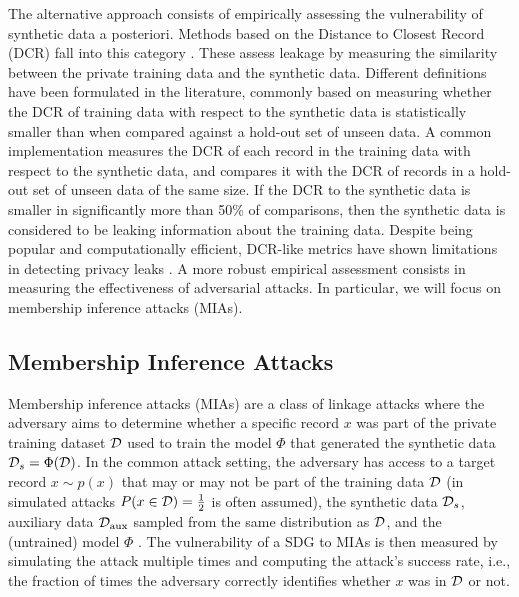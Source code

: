 The alternative approach consists of empirically assessing the vulnerability of synthetic data a posteriori.
Methods based on the Distance to Closest Record (DCR) fall into this category \citep{park2018data, kotelnikov2023tabddpm, platzer2021holdout}. These assess leakage by measuring the similarity between the private training data and the synthetic data. Different definitions have been formulated in the literature, commonly based on measuring whether the DCR of training data with respect to the synthetic data is statistically smaller than when compared against a hold-out set of unseen data.
A common implementation measures the DCR of each record in the training data with respect to the synthetic data, and compares it with the DCR of records in a hold-out set of unseen data of the same size.
If the DCR to the synthetic data is smaller in significantly more than 50\% of comparisons, then the synthetic data is considered to be leaking information about the training data.
Despite being popular and computationally efficient, DCR-like metrics have shown limitations in detecting privacy leaks \citep{yao2025dcr}.
A more robust empirical assessment consists in measuring the effectiveness of adversarial attacks. In particular, we will focus on membership inference attacks (MIAs).

\subsection{Membership Inference Attacks}
Membership inference attacks (MIAs) \citep{homer2008resolving, shokri2017membership, salem2018ml, stadler2022synthetic, hu2022membership} are a class of linkage attacks where the adversary aims to determine whether a specific record $x$ was part of the private training dataset $\mathcal{D}$ used to train the model $\Phi$ that generated the synthetic data $\mathcal{D}_s = \Phi(\mathcal{D})$.
In the common attack setting, the adversary has access to a target record $x \sim p(x)$ that may or may not be part of the training data $\mathcal{D}$ (in simulated attacks $P(x \in \mathcal{D}) = \frac{1}{2}$ is often assumed), the synthetic data $\mathcal{D}_s$, auxiliary data $\mathcal{D}_{\text{aux}}$ sampled from the same distribution as $\mathcal{D}$, and the (untrained) model $\Phi$ \citep{stadler2022synthetic}.
The vulnerability of a SDG to MIAs is then measured by simulating the attack multiple times and computing the attack's success rate, i.e., the fraction of times the adversary correctly identifies whether $x$ was in $\mathcal{D}$ or not.

